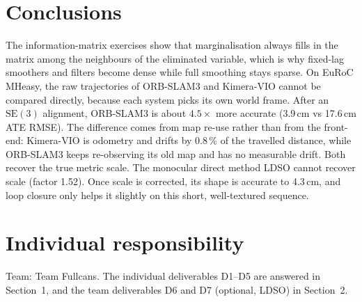 \documentclass[11pt,a4paper]{article}
\DeclareRobustCommand{\code}[1]{\begingroup\ttfamily\codebreaks#1\endgroup}
\newcommand{\codebreaks}{\renewcommand{\_}{\textunderscore\allowbreak}}
\begin{document}
\section{Conclusions}
The information-matrix exercises show that marginalisation always fills in the matrix
among the neighbours of the eliminated variable, which is why fixed-lag smoothers and filters
become dense while full smoothing stays sparse. On EuRoC \code{MH\_01\_easy}, the raw
trajectories of ORB-SLAM3 and Kimera-VIO cannot be compared directly, because each system
picks its own world frame. After an $\mathrm{SE}(3)$ alignment, ORB-SLAM3 is about $4.5\times$ more
accurate (3.9\,cm vs 17.6\,cm ATE RMSE). The difference comes from map re-use rather than from
the front-end: Kimera-VIO is odometry and drifts by 0.8\,\% of the travelled distance, while
ORB-SLAM3 keeps re-observing its old map and has no measurable drift. Both recover the true
metric scale. The monocular direct method LDSO cannot recover scale (factor 1.52). Once scale is
corrected, its shape is accurate to 4.3\,cm, and loop closure only helps it slightly on this short,
well-textured sequence.

\section*{Individual responsibility}
Team: Team Fullcans. The individual deliverables D1--D5 are answered in
Section~1, and the team deliverables D6 and D7 (optional, LDSO) in Section~2.



\end{document}
